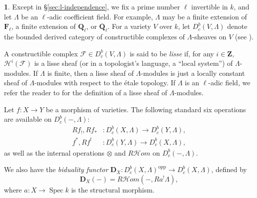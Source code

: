 \documentclass[english]{smfart}
\renewcommand{\mathbb}{\mathbf}
\newcommand{\Hom}{\mathcal{H}\!\textit{om}}
\theoremstyle{remark}
\theoremstyle{plain}
\theoremstyle{definition}
\numberwithin{equation}{remark}
\theoremstyle{void}
\newtheorem{situation}[remark]{}
\begin{document}
\begin{situation}
Except in \S\ref{sec:l-independence}, we fix a prime number \(\ell\)
invertible in \(k\), and let \(\Lambda\) be an \(\ell\)-adic
coefficient field.  For example, \(\Lambda\) may be a finite extension
of \(\mathbb{F}_{\ell}\), a finite extension of \(\mathbb{Q}_{\ell}\),
or \(\overline{\mathbb{Q}}_{\ell}\).  For a variety \(V\) over \(k\),
let \(D^b_c(V,\Lambda)\) denote the bounded derived category of
constructible complexes of \(\Lambda\)-sheaves on \(V\) (see
\cite[\S1.1]{deligne_weil2}).

A constructible complex \(\mathcal{F} \in D^b_c(V,\Lambda)\) is said
to be \emph{lisse} if, for any \(i \in \mathbb{Z}\),
\(\mathcal{H}^i(\mathcal{F})\) is a lisse sheaf (or in a topologist's
language, a ``local system'') of \(\Lambda\)-modules.  If \(\Lambda\)
is finite, then a lisse sheaf of \(\Lambda\)-modules is just a locally
constant sheaf of \(\Lambda\)-modules with respect to the étale
topology.  If \(\Lambda\) is an \(\ell\)-adic field, we refer the
reader to \cite[(1.1.1b)]{deligne_weil2} for the definition of a lisse
sheaf of \(\Lambda\)-modules.

Let \(f\colon X \to Y\) be a morphism of varieties.  The following
standard six operations are available on \(D^b_c(-, \Lambda)\):
\begin{align*}
  Rf_{!}, Rf_{\ast} &\colon D^b_c(X, \Lambda) \to D^b_c(Y, \Lambda), \\
  f^{\ast}, Rf^{!} &\colon D^b_c(Y, \Lambda) \to D^b_c(X, \Lambda),
\end{align*}
as well as the internal operations \(\otimes\) and \(R\Hom\) on
\(D^b_c(-, \Lambda)\).

We also have the \emph{biduality functor}
\(\mathbb{D}_{X} \colon D^b_c(X, \Lambda)^{\mathrm{opp}} \to D^b_c(X, \Lambda)\),
defined by
\[
\mathbb{D}_{X}(-) = R\Hom(-, Ra^! \Lambda),
\]
where \(a\colon X \to \operatorname{Spec}k\) is the structural
morphism.

\end{situation}
\end{document}
